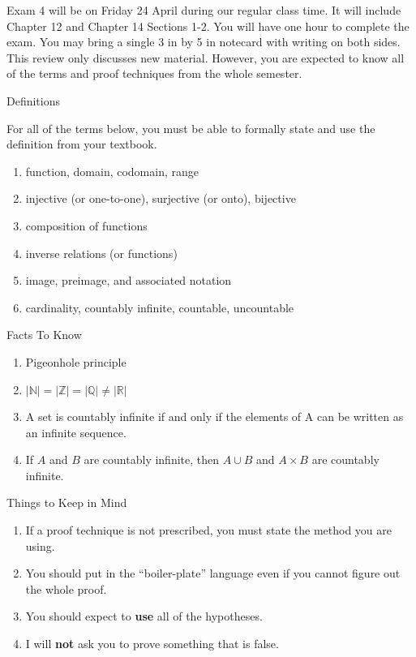 \documentclass[12pt]{article}
\renewcommand{\emph}[1]{\textsf{\textbf{#1}}}
\def\R{{\mathbb R}}
\def\N{{\mathbb N}}
\def\Z{{\mathbb Z}}
\def\Q{{\mathbb Q}}
\newcommand{\be}{\begin{enumerate}}
\newcommand{\ee}{\end{enumerate}}
\begin{document}
\thispagestyle{fancy}

Exam 4 will be on Friday 24 April during our regular class time. It will include Chapter 12 and Chapter 14 Sections 1-2.  You will have one hour to complete the exam. You may bring a single 3 in by 5 in notecard with writing on both sides.\\

This review only discusses new material. However, you are expected to know all of the terms and proof techniques from the whole semester.\\

\begin{center} Definitions \end{center}

For all of the terms below, you must be able to formally state and use the definition from your textbook. 

\be
\item function, domain, codomain, range
\item injective (or one-to-one), surjective (or onto), bijective
\item composition of functions
\item inverse relations (or functions)
\item image, preimage, and associated notation
\item cardinality, countably infinite, countable, uncountable
\ee

\begin{center} Facts To Know \end{center}
\be
\item Pigeonhole principle
\item $|\N|=|\Z|=|\Q| \neq |\R|$
\item A set is countably infinite if and only if the elements of A can be written as an infinite sequence.
\item If $A$ and $B$ are countably infinite, then $A\cup B$ and $A \times B$ are countably infinite.
\ee


\begin{center} Things to Keep in Mind \end{center}
\be
\item If a proof technique is not prescribed, you must state the method you are using.
\item You should put in the ``boiler-plate'' language even if you cannot figure out the whole proof.
\item You should expect to \emph{use} all of the hypotheses.
\item I will \emph{not} ask you to prove something that is false.
\ee
\end{document}
